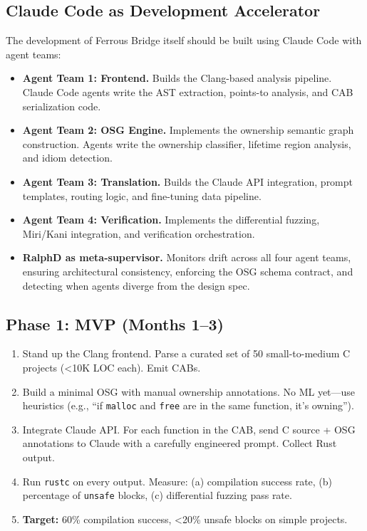\documentclass[11pt,a4paper]{article}
\theoremstyle{definition}
\theoremstyle{remark}
\begin{document}
\subsection{Claude Code as Development Accelerator}

The development of Ferrous Bridge itself should be built using Claude Code with agent teams:

\begin{itemize}[leftmargin=2em]
\item \textbf{Agent Team 1: Frontend.} Builds the Clang-based analysis pipeline. Claude Code agents write the AST extraction, points-to analysis, and CAB serialization code.
\item \textbf{Agent Team 2: OSG Engine.} Implements the ownership semantic graph construction. Agents write the ownership classifier, lifetime region analysis, and idiom detection.
\item \textbf{Agent Team 3: Translation.} Builds the Claude API integration, prompt templates, routing logic, and fine-tuning data pipeline.
\item \textbf{Agent Team 4: Verification.} Implements the differential fuzzing, Miri/Kani integration, and verification orchestration.
\item \textbf{RalphD as meta-supervisor.} Monitors drift across all four agent teams, ensuring architectural consistency, enforcing the OSG schema contract, and detecting when agents diverge from the design spec.
\end{itemize}

\subsection{Phase 1: MVP (Months 1--3)}

\begin{enumerate}[leftmargin=2em]
\item Stand up the Clang frontend. Parse a curated set of 50 small-to-medium C projects (\textless 10K LOC each). Emit CABs.
\item Build a minimal OSG with manual ownership annotations. No ML yet---use heuristics (e.g., ``if \texttt{malloc} and \texttt{free} are in the same function, it's owning'').
\item Integrate Claude API. For each function in the CAB, send C source + OSG annotations to Claude with a carefully engineered prompt. Collect Rust output.
\item Run \texttt{rustc} on every output. Measure: (a) compilation success rate, (b) percentage of \texttt{unsafe} blocks, (c) differential fuzzing pass rate.
\item \textbf{Target:} 60\% compilation success, \textless 20\% unsafe blocks on simple projects.
\end{enumerate}
\end{document}
